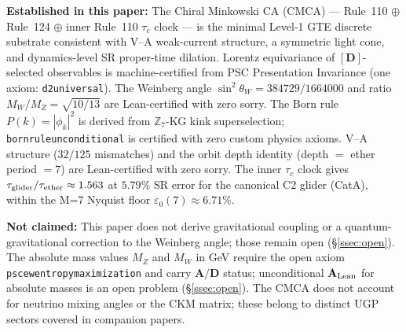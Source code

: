 \documentclass[11pt]{article}
\theoremstyle{remark}
\newcommand{\ZS}{\mathbb{Z}_7}
\newcommand{\lean}[1]{%
  \penalty-100
  \begingroup\def\_{\textunderscore\allowbreak}\texttt{#1}\endgroup}
\newcommand{\sinwsq}{\sin^2\!\theta_W}
\newcommand{\epsz}{\varepsilon_0}
\newcommand{\CatAL}{\ensuremath{\textbf{A}_{\rm Lean}}}
\newcommand{\CatAD}{\textbf{A/D}}
\begin{document}
\medskip

\begin{tcolorbox}[colback=orange!4,colframe=orange!55!black,
  title={\textbf{What this paper does and does not claim}},
  fonttitle=\bfseries,left=6pt,right=6pt,top=5pt,bottom=5pt]
\small
\textbf{Established in this paper:}
The Chiral Minkowski CA (CMCA) --- Rule~110 $\oplus$ Rule~124 $\oplus$ inner
Rule~110 $\tau_c$ clock --- is the minimal Level-1 GTE discrete substrate
consistent with V--A weak-current structure, a symmetric light cone, and
dynamics-level SR proper-time dilation.
Lorentz equivariance of $[\mathbf{D}]$-selected observables is machine-certified
from PSC Presentation Invariance (one axiom: \lean{d2\_universal}).
The Weinberg angle $\sinwsq=384729/1664000$ and ratio $M_W/M_Z=\sqrt{10/13}$
are Lean-certified with zero sorry.
The Born rule $P(k)=|\phi_k|^2$ is derived from $\ZS$-KG kink superselection;
\lean{born\_rule\_unconditional} is certified with zero custom physics axioms.
V--A structure ($32/125$ mismatches) and the orbit depth identity
(depth $= $ ether period $= 7$) are Lean-certified with zero sorry.
The inner $\tau_c$ clock gives $\tau_{\rm glider}/\tau_{\rm ether}\approx1.563$
at $5.79\%$ SR error for the canonical C2 glider (CatA), within the
M=7 Nyquist floor $\epsz(7)\approx6.71\%$.

\textbf{Not claimed:}
This paper does not derive gravitational coupling or a quantum-gravitational
correction to the Weinberg angle; those remain open (\S\ref{ssec:open}).
The absolute mass values $M_Z$ and $M_W$ in GeV require the open axiom
\lean{psc\_ew\_entropy\_maximization} and carry $\CatAD$ status; unconditional
$\CatAL$ for absolute masses is an open problem (\S\ref{ssec:open}).
The CMCA does not account for neutrino mixing angles or the CKM
matrix; these belong to distinct UGP sectors covered in companion papers.
\end{tcolorbox}

\medskip
\end{document}
